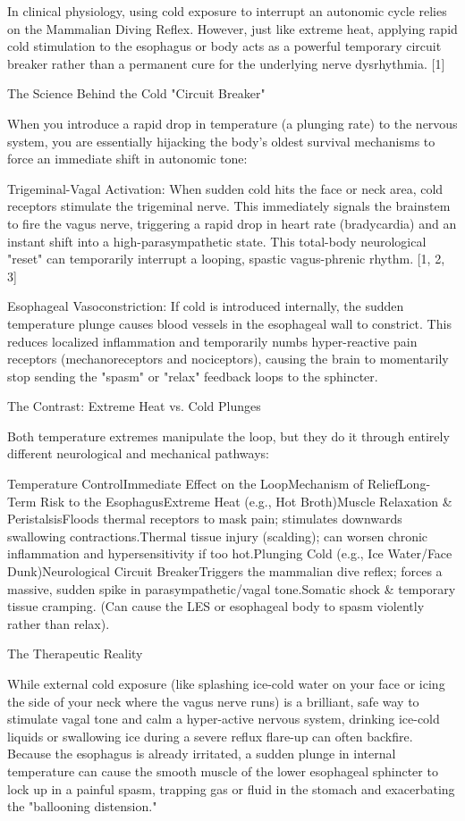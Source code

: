 In clinical physiology, using cold exposure to interrupt an autonomic cycle relies on the Mammalian Diving Reflex. However, just like extreme heat, applying rapid cold stimulation to the esophagus or body acts as a powerful temporary circuit breaker rather than a permanent cure for the underlying nerve dysrhythmia. [1]

The Science Behind the Cold "Circuit Breaker"

When you introduce a rapid drop in temperature (a plunging rate) to the nervous system, you are essentially hijacking the body’s oldest survival mechanisms to force an immediate shift in autonomic tone:

Trigeminal-Vagal Activation: When sudden cold hits the face or neck area, cold receptors stimulate the trigeminal nerve. This immediately signals the brainstem to fire the vagus nerve, triggering a rapid drop in heart rate (bradycardia) and an instant shift into a high-parasympathetic state. This total-body neurological "reset" can temporarily interrupt a looping, spastic vagus-phrenic rhythm. [1, 2, 3]

Esophageal Vasoconstriction: If cold is introduced internally, the sudden temperature plunge causes blood vessels in the esophageal wall to constrict. This reduces localized inflammation and temporarily numbs hyper-reactive pain receptors (mechanoreceptors and nociceptors), causing the brain to momentarily stop sending the "spasm" or "relax" feedback loops to the sphincter.

The Contrast: Extreme Heat vs. Cold Plunges

Both temperature extremes manipulate the loop, but they do it through entirely different neurological and mechanical pathways:

Temperature ControlImmediate Effect on the LoopMechanism of ReliefLong-Term Risk to the EsophagusExtreme Heat (e.g., Hot Broth)Muscle Relaxation & PeristalsisFloods thermal receptors to mask pain; stimulates downwards swallowing contractions.Thermal tissue injury (scalding); can worsen chronic inflammation and hypersensitivity if too hot.Plunging Cold (e.g., Ice Water/Face Dunk)Neurological Circuit BreakerTriggers the mammalian dive reflex; forces a massive, sudden spike in parasympathetic/vagal tone.Somatic shock & temporary tissue cramping. (Can cause the LES or esophageal body to spasm violently rather than relax).

The Therapeutic Reality

While external cold exposure (like splashing ice-cold water on your face or icing the side of your neck where the vagus nerve runs) is a brilliant, safe way to stimulate vagal tone and calm a hyper-active nervous system, drinking ice-cold liquids or swallowing ice during a severe reflux flare-up can often backfire. Because the esophagus is already irritated, a sudden plunge in internal temperature can cause the smooth muscle of the lower esophageal sphincter to lock up in a painful spasm, trapping gas or fluid in the stomach and exacerbating the "ballooning distension."

